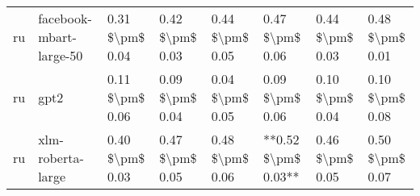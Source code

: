 \begin{tabular}{llllllll}
      ru &            facebook-mbart-large-50 & 0.31 \$\textbackslash pm\$ 0.04 &           0.42 \$\textbackslash pm\$ 0.03 &       0.44 \$\textbackslash pm\$ 0.05 &        0.47 \$\textbackslash pm\$ 0.06 &                         0.44 \$\textbackslash pm\$ 0.03 &     0.48 \$\textbackslash pm\$ 0.01 \\
      ru &                               gpt2 & 0.11 \$\textbackslash pm\$ 0.06 &           0.09 \$\textbackslash pm\$ 0.04 &       0.04 \$\textbackslash pm\$ 0.05 &        0.09 \$\textbackslash pm\$ 0.06 &                         0.10 \$\textbackslash pm\$ 0.04 &     0.10 \$\textbackslash pm\$ 0.08 \\
      ru &                  xlm-roberta-large & 0.40 \$\textbackslash pm\$ 0.03 &           0.47 \$\textbackslash pm\$ 0.05 &       0.48 \$\textbackslash pm\$ 0.06 &    **0.52 \$\textbackslash pm\$ 0.03** &                         0.46 \$\textbackslash pm\$ 0.05 &     0.50 \$\textbackslash pm\$ 0.07 \\
\bottomrule
\end{tabular}
